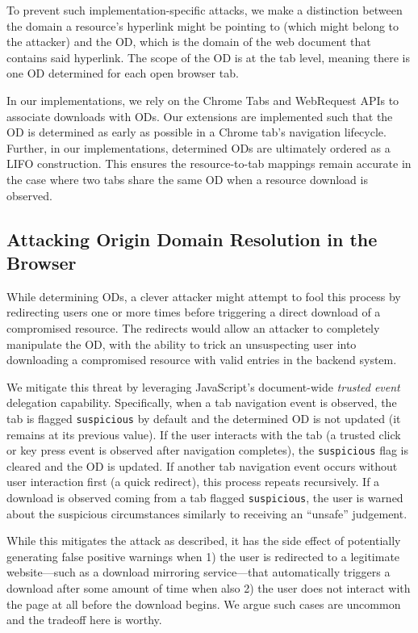 To prevent such implementation-specific attacks, we make a distinction between
the domain a resource's hyperlink might be pointing to (which might belong to
the attacker) and the OD, which is the domain of the web document that contains
said hyperlink. The scope of the OD is at the tab level, meaning there is one OD
determined for each open browser tab.

In our implementations, we rely on the Chrome Tabs and WebRequest APIs to
associate downloads with ODs. Our extensions are implemented such that the OD is
determined as early as possible in a Chrome tab's navigation lifecycle. Further,
in our implementations, determined ODs are ultimately ordered as a LIFO
construction. This ensures the resource-to-tab mappings remain accurate in the
case where two tabs share the same OD when a resource download is observed.

\subsection{Attacking Origin Domain Resolution in the Browser}

While determining ODs, a clever attacker might attempt to fool this process by
redirecting users one or more times before triggering a direct download of a
compromised resource. The redirects would allow an attacker to completely
manipulate the OD, with the ability to trick an unsuspecting user into
downloading a compromised resource with valid entries in the backend system.

We mitigate this threat by leveraging JavaScript's document-wide \emph{trusted
event}~\cite{TrustedEvents} delegation capability. Specifically, when a tab
navigation event is observed, the tab is flagged \texttt{suspicious} by default
and the determined OD is not updated (\ie it remains at its previous value). If
the user interacts with the tab (\ie a trusted click or key press event is
observed after navigation completes), the \texttt{suspicious} flag is cleared
and the OD is updated. If another tab navigation event occurs without user
interaction first (\eg a quick redirect), this process repeats recursively. If a
download is observed coming from a tab flagged \texttt{suspicious}, the user is
warned about the suspicious circumstances similarly to receiving an ``unsafe''
judgement.

While this mitigates the attack as described, it has the side effect of
potentially generating false positive warnings when 1) the user is redirected to
a legitimate website---such as a download mirroring service---that automatically
triggers a download after some amount of time when also 2) the user does not
interact with the page at all before the download begins. We argue such cases
are uncommon and the tradeoff here is worthy.

